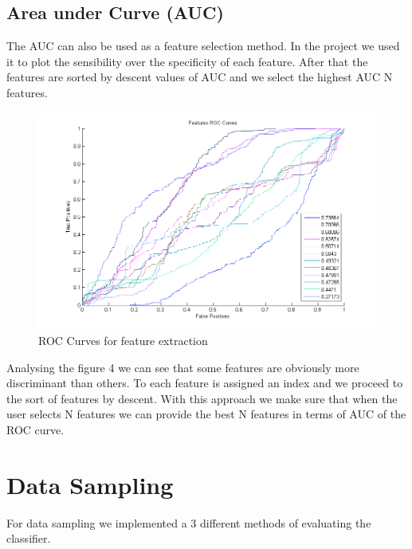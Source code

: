 \documentclass[english, a4paper, 12pt]{article}
\newcommand{\tab}{\hspace*{2em}}
\begin{document}
\subsection{Area under Curve (AUC)}
\tab The AUC can also be used as a feature selection method. In the project we used it to plot the sensibility over the specificity of each feature. After that the features are sorted by descent values of AUC and we select the highest AUC N features.\\
\begin{figure}[H]
  \centering
  \includegraphics[scale= 0.5]{froc.png}
  \caption {ROC Curves for feature extraction}
\end{figure}
\tab Analysing the figure 4 we can see that some features are obviously more discriminant than others. To each feature is assigned an index and we proceed to the sort of features by descent. With this approach we make sure that when the user selects N features we can provide the best N features in terms of AUC of the ROC curve.
\section{Data Sampling}
\tab For data sampling we implemented a 3 different methods of evaluating the classifier.
\end{document}
